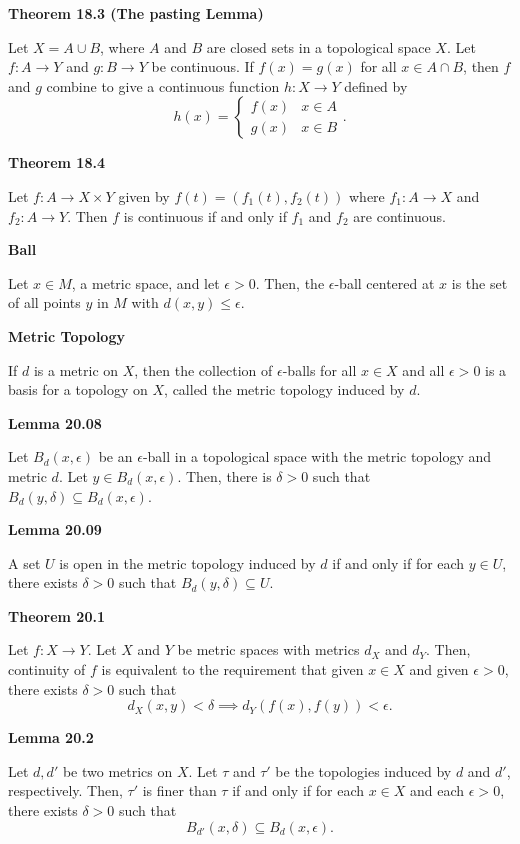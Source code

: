 \documentclass{article}
\begin{document}
\medskip\noindent\textbf{Theorem 18.3 (The pasting Lemma)}

    Let $X = A \cup B$, where $A$ and $B$ are closed sets in a topological space $X$.
    Let $f: A \to Y$ and $g: B \to Y$ be continuous.
    If $f(x) = g(x)$ for all $x \in A \cap B$, then $f$ and $g$ combine to give a continuous function $h: X \to Y$ defined by
    $$h(x) = \begin{cases} f(x) & x \in A \\ g(x) & x \in B \end{cases}.$$

\medskip\noindent\textbf{Theorem 18.4}

    Let $f: A \to X \times Y$ given by $f(t) = (f_1(t), f_2(t))$ where $f_1: A \to X$ and $f_2: A \to Y$. Then $f$ is continuous if and only if $f_1$ and $f_2$ are continuous.

\medskip\noindent\textbf{Ball}

    Let $x \in M$, a metric space, and let $\epsilon > 0$. Then, the $\epsilon$-ball centered at $x$ is the set of all points $y$ in $M$ with $d(x,y) \leq \epsilon$.

\medskip\noindent\textbf{Metric Topology}

    If $d$ is a metric on $X$, then the collection of $\epsilon$-balls for all $x \in X$ and all $\epsilon > 0$ is a basis for a topology on $X$, called the metric topology induced by $d$.

\medskip\noindent\textbf{Lemma 20.08}

    Let $B_d(x, \epsilon)$ be an $\epsilon$-ball in a topological space with the metric topology and metric $d$. Let $y \in B_d(x, \epsilon)$. Then, there is $\delta > 0$ such that $B_d(y, \delta) \subseteq B_d(x,\epsilon)$.

\medskip\noindent\textbf{Lemma 20.09}

    A set $U$ is open in the metric topology induced by $d$ if and only if for each $y \in U$, there exists $\delta > 0$ such that $B_d(y, \delta) \subseteq U$.

\medskip\noindent\textbf{Theorem 20.1}

	Let $f: X \to Y$. Let $X$ and $Y$ be metric spaces with metrics $d_X$ and $d_Y$.
	Then, continuity of $f$ is equivalent to the requirement that given $x \in X$ and given $\epsilon > 0$, there exists $\delta > 0$ such that $$d_X(x,y) < \delta \implies d_Y(f(x),f(y))< \epsilon.$$

\medskip\noindent\textbf{Lemma 20.2}

	Let $d, d'$ be two metrics on $X$. Let $\tau$ and $\tau'$ be the topologies induced by $d$ and $d'$, respectively. Then, $\tau'$ is finer than $\tau$ if and only if for each $x \in X$ and each $\epsilon > 0$, there exists $\delta > 0$ such that $$B_{d'}(x,\delta) \subseteq B_d(x,\epsilon).$$
\end{document}
